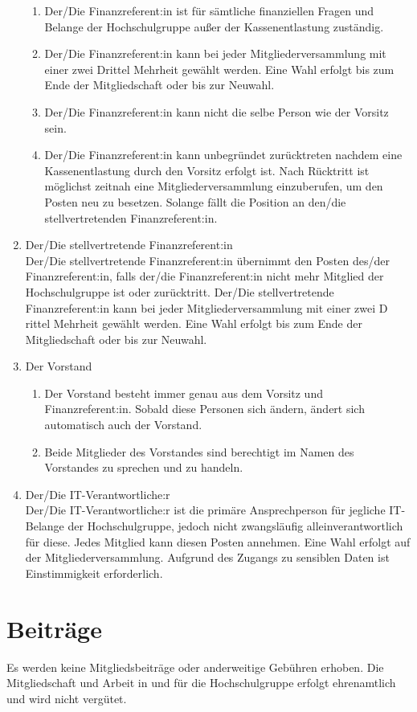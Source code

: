 \documentclass[11pt]{article}
\begin{document}
\begin{enumerate}
\begin{enumerate}
		      \item Der/Die Finanzreferent:in ist für sämtliche finanziellen Fragen und Belange der Hochschulgruppe außer der Kassenentlastung zuständig.
		      \item Der/Die Finanzreferent:in kann bei jeder Mitgliederversammlung mit einer zwei Drittel Mehrheit gewählt werden. Eine Wahl erfolgt bis zum Ende der Mitgliedschaft oder bis zur Neuwahl.
		      \item Der/Die Finanzreferent:in kann nicht die selbe Person wie der Vorsitz sein.
		      \item Der/Die Finanzreferent:in kann unbegründet zurücktreten nachdem eine Kassenentlastung durch den Vorsitz erfolgt ist. Nach Rücktritt ist möglichst zeitnah eine Mitgliederversammlung einzuberufen,  um den Posten neu zu besetzen. Solange fällt die Position an den/die stellvertretenden Finanzreferent:in.
	      \end{enumerate}
	\item Der/Die stellvertretende Finanzreferent:in\\
	      Der/Die stellvertretende Finanzreferent:in übernimmt den Posten des/der Finanzreferent:in, falls der/die Finanzreferent:in nicht mehr Mitglied der Hochschulgruppe ist oder zurücktritt. Der/Die stellvertretende Finanzreferent:in kann bei jeder Mitgliederversammlung mit einer zwei D
	      rittel Mehrheit gewählt werden. Eine Wahl erfolgt bis zum Ende der Mitgliedschaft oder bis zur Neuwahl.
	\item Der Vorstand
	      \begin{enumerate}
		      \item Der Vorstand besteht immer genau aus dem Vorsitz und Finanzreferent:in. Sobald diese Personen sich ändern, ändert sich automatisch auch der Vorstand.
		      \item Beide Mitglieder des Vorstandes sind berechtigt im Namen des Vorstandes zu sprechen und zu handeln.
	      \end{enumerate}
	\item Der/Die IT-Verantwortliche:r\\
	      Der/Die IT-Verantwortliche:r ist die primäre Ansprechperson für jegliche IT-Belange der Hochschulgruppe, jedoch nicht zwangsläufig alleinverantwortlich für diese. Jedes Mitglied kann diesen Posten annehmen. Eine Wahl erfolgt auf der Mitgliederversammlung. Aufgrund des Zugangs zu sensiblen Daten ist Einstimmigkeit erforderlich.
\end{enumerate}
\section{Beiträge}
Es werden keine Mitgliedsbeiträge oder anderweitige Gebühren erhoben. Die Mitgliedschaft und Arbeit in und für die Hochschulgruppe erfolgt ehrenamtlich und wird nicht vergütet.
\end{document}
